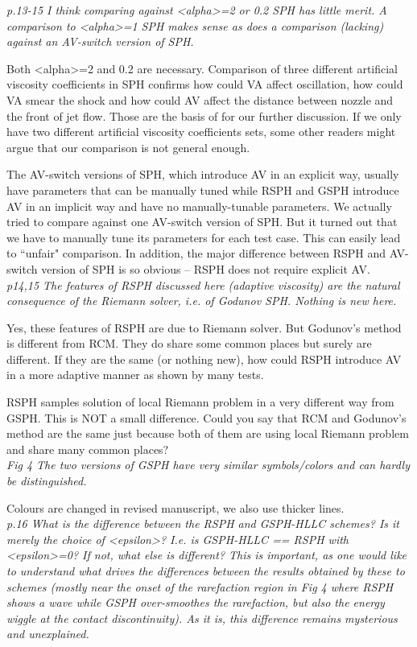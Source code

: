 \documentclass[10pt,a4paper]{article}
\begin{document}
\textit{p.13-15 I think comparing against <alpha>=2 or 0.2 SPH has little merit.
A comparison to <alpha>=1 SPH makes sense as does a comparison (lacking)
against an AV-switch version of SPH.}

Both <alpha>=2 and 0.2 are necessary. Comparison of three different artificial viscosity coefficients in SPH confirms how could VA affect oscillation, how could VA smear the shock and how could AV affect the distance between nozzle and the front of jet flow. Those are the basis of for our further discussion. If we only have two different artificial viscosity coefficients sets, some other readers might argue that our comparison is not general enough.

The AV-switch versions of SPH, which introduce AV in an explicit way, usually have parameters that can be manually tuned while RSPH and GSPH introduce AV in an implicit way and have no manually-tunable parameters. 
We actually tried to compare against one AV-switch version of SPH. But it turned out that we have to manually tune its parameters for each test case. This can easily lead to ``unfair" comparison. In addition, the major difference between RSPH and AV-switch version of SPH is so obvious -- RSPH does not require explicit AV.
\\[3pt]

\textit{p14,15 The features of RSPH discussed here (adaptive viscosity) are the
natural consequence of the Riemann solver, i.e. of Godunov SPH. Nothing
is new here.}

Yes, these features of RSPH are due to Riemann solver. 
But Godunov's method is different from RCM.
They do share some common places but surely are different. If they are the same (or nothing new), how could RSPH introduce AV in a more adaptive manner as shown by many tests.

RSPH samples solution of local Riemann problem in a very different way from GSPH. This is NOT a small difference. Could you say that RCM and Godunov's method are the same just because both of them are using local Riemann problem and share many common places?
\\[3pt]

\textit{Fig 4 The two versions of GSPH have very similar symbols/colors and can hardly be distinguished.}

Colours are changed in revised manuscript, we also use thicker lines. 
\\[3pt]

\textit{p.16 What is the difference between the RSPH and GSPH-HLLC schemes? Is it
merely the choice of <epsilon>? I.e. is GSPH-HLLC == RSPH with <epsilon>=0? If not, what else is different? This is important, as one would like to understand what drives the differences between the results obtained by these to schemes (mostly near
the onset of the rarefaction region in Fig 4 where RSPH shows a wave while GSPH over-smoothes the rarefaction, but also the energy wiggle at
the contact discontinuity). As it is, this difference remains mysterious and unexplained.}
\end{document}
